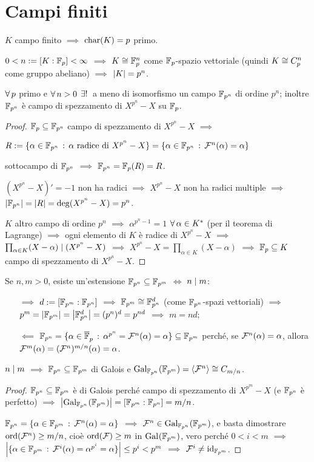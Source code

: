 \section{Campi finiti}

$K$ campo finito $\implies$ $\car(K)=p$ primo.

$0<n:=[K:\F_p]<\infty$ $\implies$ $K\iso\F_p^n$ come $\F_p$-spazio vettoriale (quindi $K\iso C_p^n$ come gruppo abeliano) $\implies$ $\card{K}=p^n$.
\begin{teor}
$\all p$ primo e $\all n>0$ $\exiun$ a meno di isomorfismo un campo $\F_{p^n}$ di ordine $p^n$; inoltre $\F_{p^n}$ è campo di spezzamento di $X^{p^n}-X$ su $\F_p$.
\end{teor}
\begin{proof}
$\F_p\subseteq\F_{p^n}$ campo di spezzamento di $X^{p^n}-X$ $\implies$

$R:=\{\alpha\in\F_{p^n}\st\alpha\text{ radice di }X^{p^n}-X\}=\{\alpha\in\F_{p^n}\st\Fro^n(\alpha)=\alpha\}$

sottocampo di $\F_{p^n}$ $\implies$ $\F_{p^n}=\F_p(R)=R$.

$(X^{p^n}-X)'=-1$ non ha radici $\implies$ $X^{p^n}-X$ non ha radici multiple $\implies$ $\card{\F_{p^n}}=\card{R}=\deg(X^{p^n}-X)=p^n$.

$K$ altro campo di ordine $p^n$ $\implies$ $\alpha^{p^n-1}=1$ $\all\alpha\in K^*$ (per il teorema di Lagrange) $\implies$ ogni elemento di $K$ è radice di $X^{p^n}-X$ $\implies$ $\prod_{\alpha\in K}(X-\alpha)\dvd(X^{p^n}-X)$ $\implies$ $X^{p^n}-X=\prod_{\alpha\in K}(X-\alpha)$ $\implies$ $\F_p\subseteq K$ campo di spezzamento di $X^{p^n}-X$.
\end{proof}

Se $n,m>0$, esiste un'estensione $\F_{p^n}\subseteq\F_{p^m}$ $\iff$ $n\dvd m$:
\begin{itemize}
\item[$\implies$] $d:=[\F_{p^m}:\F_{p^n}]$ $\implies$ $\F_{p^m}\iso\F_{p^n}^d$ (come $\F_{p^n}$-spazi vettoriali) $\implies$ $p^m=\card{\F_{p^m}}=\card{\F_{p^n}^d}=(p^n)^d=p^{nd}$ $\implies$ $m=nd$;
\item[$\impliedby$] $\F_{p^n}=\{\alpha\in\calg{\F}_p\st\alpha^{p^n}=\Fro^n(\alpha)=\alpha\}\subseteq\F_{p^m}$ perché, se $\Fro^n(\alpha)=\alpha$, allora $\Fro^m(\alpha)=(\Fro^n)^{m/n}(\alpha)=\alpha$.
\end{itemize}

\begin{coro}
$n\dvd m$ $\implies$ $\F_{p^n}\subseteq\F_{p^m}$ di Galois e $\Gal[\F_{p^n}]{\F_{p^m}}=\gen{\Fro^n}\iso C_{m/n}$.
\end{coro}
\begin{proof}
$\F_{p^n}\subseteq\F_{p^m}$ è di Galois perché campo di spezzamento di $X^{p^m}-X$ (e $\F_{p^n}$ è perfetto) $\implies$ $\card{\Gal[\F_{p^n}]{\F_{p^m}}}=[\F_{p^m}:\F_{p^n}]=m/n$.

$\F_{p^n}=\{\alpha\in\F_{p^m}\st\Fro^n(\alpha)=\alpha\}$ $\implies$ $\Fro^n\in\Gal[\F_{p^n}]{\F_{p^m}}$, e basta dimostrare $\ord(\Fro^n)\ge m/n$, cioè $\ord(\Fro)\ge m$ in $\Gal{\F_{p^m}}$, vero perché $0<i<m$ $\implies$ $\card{\{\alpha\in\F_{p^m}\st\Fro^i(\alpha)=\alpha^{p^i}=\alpha\}}\le p^i<p^m$ $\implies$ $\Fro^i\ne\id_{\F_{p^m}}$.
\end{proof}


